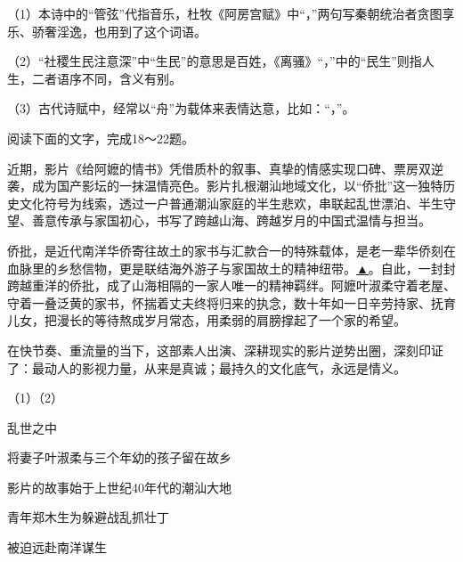 \documentclass[11pt,a4paper]{ctexart}
\begin{document}
（1）本诗中的“管弦”代指音乐，杜牧《阿房宫赋》中“\blank[6.5em]，\blank[6.5em]”两句写秦朝统治者贪图享乐、骄奢淫逸，也用到了这个词语。

（2）“社稷生民注意深”中“生民”的意思是百姓，《离骚》“\blank[6.5em]，\blank[6.5em]”中的“民生”则指人生，二者语序不同，含义有别。

（3）古代诗赋中，经常以“舟”为载体来表情达意，比如：“\blank[6.5em]，\blank[6.5em]”。

阅读下面的文字，完成18～22题。

{\ywkai 近期，影片《给阿嬷的情书》凭借质朴的叙事、真挚的情感实现口碑、票房双逆袭，成为国产影坛的一抹温情亮色。影片扎根潮汕地域文化，以“侨批”这一独特历史文化符号为线索，透过一户普通潮汕家庭的半生悲欢，串联起乱世漂泊、半生守望、善意传承与家国初心，书写了跨越山海、跨越岁月的中国式温情与担当。

侨批，是近代南洋华侨寄往故土的家书与汇款合一的特殊载体，是老一辈华侨刻在血脉里的乡愁信物，更是联结海外游子与家国故土的精神纽带。\uline{\hspace{2em}▲\hspace{2em}}。自此，一封封跨越重洋的侨批，成了山海相隔的一家人唯一的精神羁绊。阿嬷叶淑柔守着老屋、守着一叠泛黄的家书，怀揣着丈夫终将归来的执念，数十年如一日辛劳持家、抚育儿女，把漫长的等待熬成岁月常态，用柔弱的肩膀撑起了一个家的希望。

在快节奏、重流量的当下，这部素人出演、深耕现实的影片逆势出圈，深刻印证了：最动人的影视力量，从来是真诚；最持久的文化底气，永远是情义。\par}


（1）\blank[4em]（2）\blank[4em]


\noindent{}乱世之中\par
\noindent{}将妻子叶淑柔与三个年幼的孩子留在故乡\par
\noindent{}影片的故事始于上世纪40年代的潮汕大地\par
\noindent{}青年郑木生为躲避战乱抓壮丁\par
\noindent{}被迫远赴南洋谋生

\begin{choices}
\item {}
\item {}
\item {}
\item {}
\end{choices}
\end{document}
